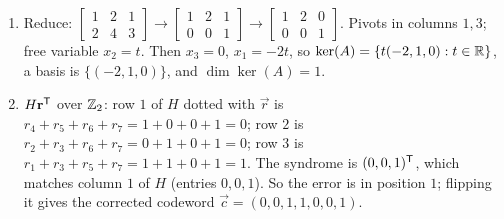\begin{enumerate}[label=\textbf{3.\arabic*},leftmargin=2.6em,itemsep=8pt]
\item Reduce: $\left[\begin{smallmatrix}1&2&1\\2&4&3\end{smallmatrix}\right]\to\left[\begin{smallmatrix}1&2&1\\0&0&1\end{smallmatrix}\right]\to\left[\begin{smallmatrix}1&2&0\\0&0&1\end{smallmatrix}\right]$. Pivots in columns $1,3$; free variable $x_2=t$. Then $x_3=0$, $x_1=-2t$, so $\ker(A)=\{t(-2,1,0):t\in\mathbb{R}\}$, a basis is $\{(-2,1,0)\}$, and $\dim\ker(A)=1$.

\item $H\mathbf{r}^{\mathsf{T}}$ over $\mathbb{Z}_2$: row $1$ of $H$ dotted with $\vec{r}$ is $r_4{+}r_5{+}r_6{+}r_7=1{+}0{+}0{+}1=0$; row $2$ is $r_2{+}r_3{+}r_6{+}r_7=0{+}1{+}0{+}1=0$; row $3$ is $r_1{+}r_3{+}r_5{+}r_7=1{+}1{+}0{+}1=1$. The syndrome is $(0,0,1)^{\mathsf{T}}$, which matches column $1$ of $H$ (entries $0,0,1$). So the error is in position $1$; flipping it gives the corrected codeword $\vec{c}=(0,0,1,1,0,0,1)$.

\end{enumerate}
